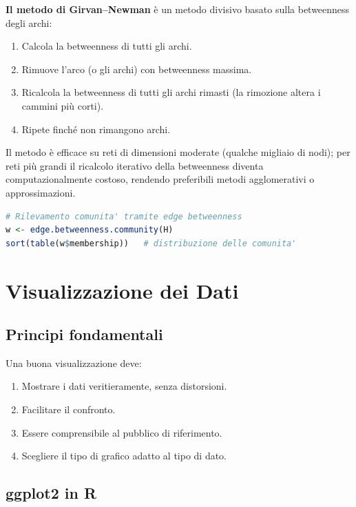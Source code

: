 \documentclass[12pt,a4paper]{article}
\begin{document}
\textbf{Il metodo di Girvan–Newman} è un metodo divisivo basato sulla betweenness degli archi:
\begin{enumerate}
  \item Calcola la betweenness di tutti gli archi.
  \item Rimuove l'arco (o gli archi) con betweenness massima.
  \item Ricalcola la betweenness di tutti gli archi rimasti (la rimozione altera i cammini
        più corti).
  \item Ripete finché non rimangono archi.
\end{enumerate}
Il metodo è efficace su reti di dimensioni moderate (qualche migliaio di nodi); per reti
più grandi il ricalcolo iterativo della betweenness diventa computazionalmente costoso,
rendendo preferibili metodi agglomerativi o approssimazioni.

\begin{lstlisting}[language=R]
# Rilevamento comunita' tramite edge betweenness
w <- edge.betweenness.community(H)
sort(table(w$membership))   # distribuzione delle comunita'
\end{lstlisting}

\section{Visualizzazione dei Dati}

\subsection{Principi fondamentali}

Una buona visualizzazione deve:
\begin{enumerate}
  \item Mostrare i dati veritieramente, senza distorsioni.
  \item Facilitare il confronto.
  \item Essere comprensibile al pubblico di riferimento.
  \item Scegliere il tipo di grafico adatto al tipo di dato.
\end{enumerate}

\subsection{ggplot2 in R}
\end{document}
